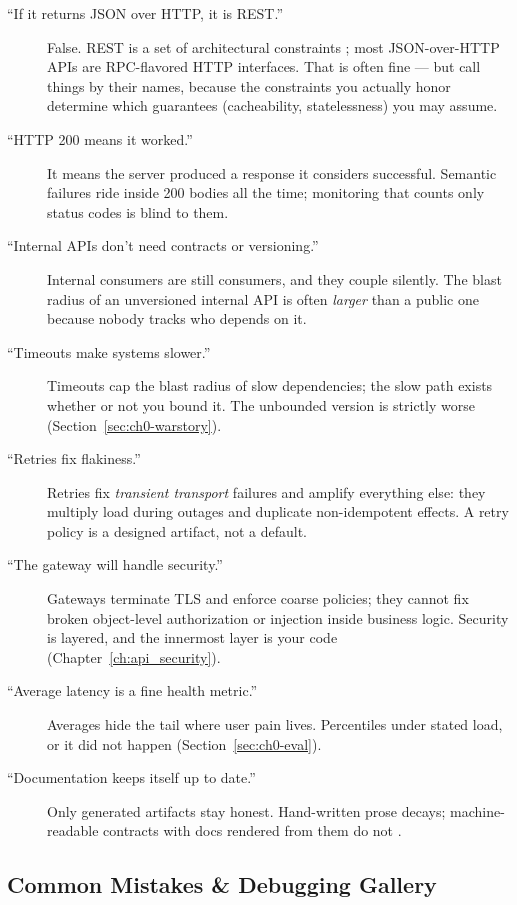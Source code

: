 \begin{description}
  \item[``If it returns JSON over HTTP, it is REST.''] False. REST is a set
    of architectural constraints \cite{fielding2000rest}; most
    JSON-over-HTTP APIs are RPC-flavored HTTP interfaces. That is often fine
    --- but call things by their names, because the constraints you actually
    honor determine which guarantees (cacheability, statelessness) you may
    assume.
  \item[``HTTP 200 means it worked.''] It means the server produced a
    response it considers successful. Semantic failures ride inside 200
    bodies all the time; monitoring that counts only status codes is blind
    to them.
  \item[``Internal APIs don't need contracts or versioning.''] Internal
    consumers are still consumers, and they couple silently. The blast
    radius of an unversioned internal API is often \emph{larger} than a
    public one because nobody tracks who depends on it.
  \item[``Timeouts make systems slower.''] Timeouts cap the blast radius of
    slow dependencies; the slow path exists whether or not you bound it.
    The unbounded version is strictly worse (Section~\ref{sec:ch0-warstory}).
  \item[``Retries fix flakiness.''] Retries fix \emph{transient transport}
    failures and amplify everything else: they multiply load during
    outages and duplicate non-idempotent effects. A retry policy is a
    designed artifact, not a default.
  \item[``The gateway will handle security.''\/] Gateways terminate TLS and
    enforce coarse policies; they cannot fix broken object-level
    authorization or injection inside business logic. Security is layered,
    and the innermost layer is your code (Chapter~\ref{ch:api_security}).
  \item[``Average latency is a fine health metric.''] Averages hide the
    tail where user pain lives. Percentiles under stated load, or it did
    not happen (Section~\ref{sec:ch0-eval}).
  \item[``Documentation keeps itself up to date.''] Only generated
    artifacts stay honest. Hand-written prose decays; machine-readable
    contracts with docs rendered from them do not \cite{openapi31}.
\end{description}

\subsection{Common Mistakes \& Debugging Gallery}
\label{sec:ch0-gallery}

